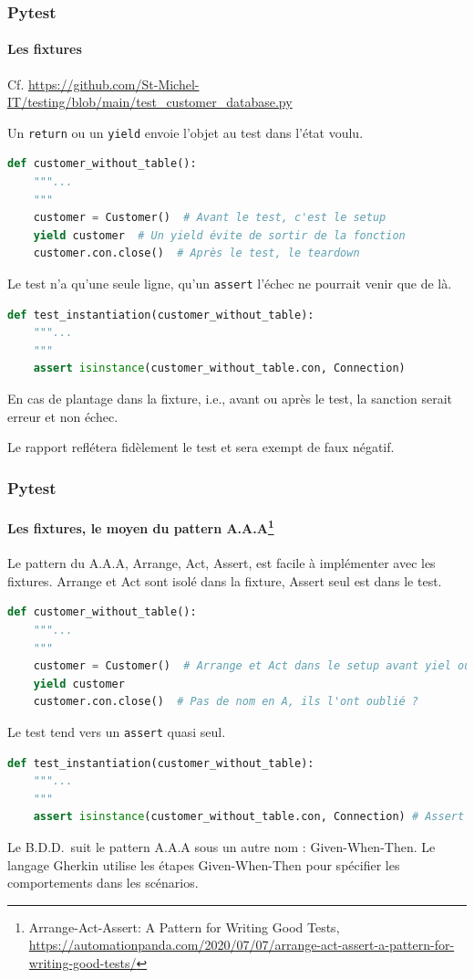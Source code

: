 \documentclass{beamer}
\begin{document}
    \begin{frame}[fragile]
        \frametitle{Pytest}
        \framesubtitle{Les fixtures}
        \transdissolve
        Cf. \url{https://github.com/St-Michel-IT/testing/blob/main/test_customer_database.py}

        Un \lstinline{return} ou un \lstinline{yield} envoie l'objet au test dans l'état voulu.
        \begin{lstlisting}[language=Python]
def customer_without_table():
    """...
    """
    customer = Customer()  # Avant le test, c'est le setup
    yield customer  # Un yield évite de sortir de la fonction
    customer.con.close()  # Après le test, le teardown
        \end{lstlisting}
        Le test n'a qu'une seule ligne, qu'un \lstinline{assert} l'échec ne
        pourrait venir que de là.
        \begin{lstlisting}[language=Python]
def test_instantiation(customer_without_table):
    """...
    """
    assert isinstance(customer_without_table.con, Connection)
        \end{lstlisting}
        En cas de plantage dans la fixture, i.e., avant ou après le test, la sanction
        serait erreur et non échec.

        Le rapport reflétera fidèlement le test et sera exempt de faux négatif.
    \end{frame}

    \begin{frame}[fragile]
        \frametitle{Pytest}
        \framesubtitle{Les fixtures, le moyen du pattern A.A.A\footnote{Arrange-Act-Assert: A Pattern for Writing Good Tests, \url{https://automationpanda.com/2020/07/07/arrange-act-assert-a-pattern-for-writing-good-tests/}}}
        \transdissolve
        Le pattern du A.A.A, Arrange, Act, Assert, est facile à implémenter avec les fixtures.
        Arrange et Act sont isolé dans la fixture, Assert seul est dans le test.

        \begin{lstlisting}[language=Python]
def customer_without_table():
    """...
    """
    customer = Customer()  # Arrange et Act dans le setup avant yiel ou return
    yield customer
    customer.con.close()  # Pas de nom en A, ils l'ont oublié ?
        \end{lstlisting}
        Le test tend vers un \lstinline{assert} quasi seul.
        \begin{lstlisting}[language=Python]
def test_instantiation(customer_without_table):
    """...
    """
    assert isinstance(customer_without_table.con, Connection) # Assert
        \end{lstlisting}
        Le B.D.D.~suit le pattern A.A.A sous un autre nom : Given-When-Then.
        Le langage Gherkin utilise les étapes Given-When-Then pour spécifier les comportements dans les scénarios.
    \end{frame}
\end{document}
